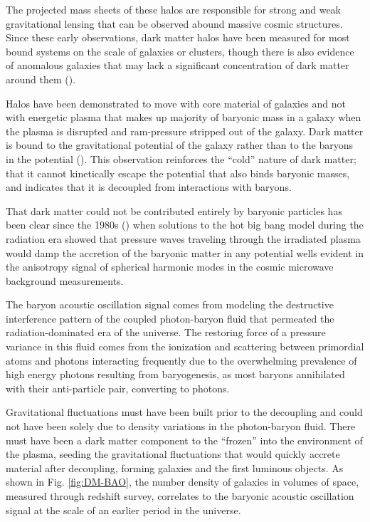 \documentclass{paper}
\begin{document}
  The projected mass sheets of these halos are responsible for strong and weak 
  gravitational lensing that can be observed abound massive cosmic 
  structures.  Since these early observations, dark matter halos have been 
  measured for most bound systems on the scale of galaxies or clusters, though 
  there is also evidence of anomalous galaxies that may lack a significant 
  concentration of dark matter around them (\cite{10.1093/mnras/stab3491}). 

  Halos have been demonstrated to move with core material of galaxies and not 
  with energetic plasma that makes up majority of baryonic mass in a galaxy when 
  the plasma is disrupted and ram-pressure stripped out of the galaxy. 
  Dark matter is bound to the gravitational potential of the galaxy rather 
  than to the baryons in the potential (\cite{Clowe_2006}). This observation 
  reinforces the ``cold'' nature of dark matter; that it cannot kinetically 
  escape the potential that also binds baryonic masses, and indicates that it 
  is decoupled from interactions with baryons. 

  That dark matter could not be contributed entirely by baryonic particles
  has been clear since the 1980s (\cite{liddle2015introduction}) when
  solutions to the hot big bang model during the radiation era showed that 
  pressure waves traveling through the irradiated plasma would damp the
  accretion of the baryonic matter in any potential wells evident in the 
  anisotropy signal of spherical harmonic modes in the cosmic microwave 
  background measurements.

  The baryon acoustic oscillation signal comes from modeling the destructive
  interference pattern of the coupled photon-baryon fluid that permeated the
  radiation-dominated era of the universe. The restoring force of a pressure
  variance in this fluid comes from the ionization and scattering between
  primordial atoms and photons interacting frequently due to the overwhelming
  prevalence of high energy photons resulting from baryogenesis, as most 
  baryons annihilated with their anti-particle pair, converting to photons.

  Gravitational fluctuations must have been built prior to the decoupling and 
  could not have been solely due to density variations in the photon-baryon 
  fluid.  There must have been a dark matter component to the ``frozen'' into 
  the environment of the plasma, seeding the gravitational fluctuations that 
  would quickly accrete material after decoupling, forming galaxies and the 
  first luminous objects. As shown in Fig. \ref{fig:DM-BAO}, the number 
  density of galaxies in volumes of space, measured through redshift survey, 
  correlates to the baryonic acoustic oscillation signal at the scale of an 
  earlier period in the universe.
\end{document}
